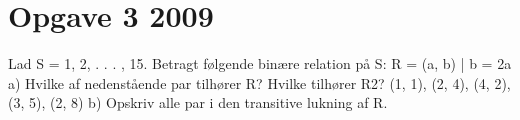 \section{Opgave 3 2009}

Lad S = {1, 2, . . . , 15}. 
Betragt følgende binære relation på S: R = {(a, b) | b = 2a}
a) Hvilke af nedenstående par tilhører R? Hvilke tilhører R2? 
(1, 1), (2, 4), (4, 2), (3, 5), (2, 8)
b) Opskriv alle par i den transitive lukning af R.

